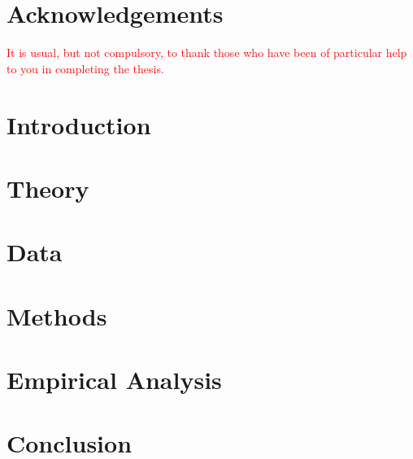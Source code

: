 \documentclass[12pt,twoside]{report}
\begin{document}

    


    \chapter*{Acknowledgements}
    \textcolor{red}{It is usual, but not compulsory, to thank those who have been of particular help to you in completing the thesis.}

    {\hypersetup{linkcolor=black}
        \tableofcontents
        \listoffigures
        \listoftables
    }
        {\hypersetup{linkcolor=mycolor}}
    
    \chapter{Introduction} 
    
     
    \chapter{Theory}
    
    
    \chapter{Data}
    
    
    \chapter{Methods}
    
    
    \chapter{Empirical Analysis}
    
    
    \chapter{Conclusion}
    
    
\end{document}
